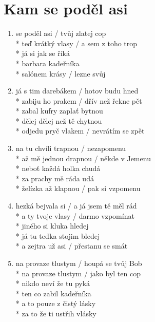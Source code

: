 \section{Kam se poděl asi}
\begin{enumerate}
\item {} se poděl asi           /  tvůj zlatej cop \\*
 teď krátký vlasy / a  sem z toho trop \\*
 já si jak se říká \\*
 barbara kadeřníka \\*
 salónem krásy / lezne svůj  
\item já s tim darebákem / hotov budu hned \\*
zabiju ho prakem / dřív než řekne pět \\*
zabal kufry zaplať bytnou \\*
dělej dělej než tě chytnou \\*
odjedu pryč vlakem / nevrátím se zpět 
\item na tu chvíli trapnou / nezapomenu \\*
až mě jednou drapnou / někde v Jemenu \\*
neboť každá holka chudá \\*
za prachy mě ráda udá \\*
želízka až klapnou / pak si vzpomenu 
\item hezká bejvala si / a já jsem tě měl rád \\*
a ty tvoje vlasy / darmo vzpomínat \\*
jiného si kluka hledej \\*
já tu teďka stojim bledej \\*
a zejtra už asi / přestanu se smát 
\item na provaze tlustym / houpá se tvůj Bob \\*
na provaze tlustym / jako byl ten cop \\*
nikdo neví že tu pyká \\*
ten co zabil kadeřníka \\*
a to pouze z čistý lásky \\*
za to že ti ustřih vlásky
\end{enumerate}
